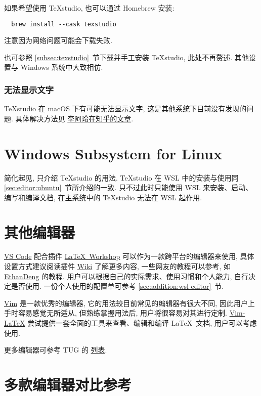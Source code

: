 如果希望使用 \TeX studio, 也可以通过 Homebrew 安装:
\begin{lstlisting}
  brew install --cask texstudio
\end{lstlisting}
注意因为网络问题可能会下载失败.

也可参照 \ref{subsec:texstudio}~节下载并手工安装 \TeX studio, 此处不再赘述.
其他设置与 Windows 系统中大致相仿.

\subsubsection{无法显示文字}

\TeX studio 在 macOS 下有可能无法显示文字,
这是其他系统下目前没有发现的问题.
具体解决方法见%
\href{https://zhuanlan.zhihu.com/p/80728204}{李阿玲在知乎的文章}.

\section{Windows Subsystem for Linux}\label{sec:editor:wsl}

简化起见,
只介绍 \TeX studio 的用法.
\TeX studio 在 WSL 中的安装与使用同 \ref{sec:editor:ubuntu}~节所介绍的一致.
只不过此时只能使用 WSL 来安装、启动、编写和编译文档,
在主系统中的 \TeX studio 无法在 WSL 起作用.

\section{其他编辑器}

\href{https://code.visualstudio.com/}{VS Code}
配合插件
\href{https://marketplace.visualstudio.com/items?itemName=James-Yu.latex-workshop}{\LaTeX\ Workshop}
可以作为一款跨平台的编辑器来使用,
具体设置方式建议阅读插件
\href{https://github.com/James-Yu/LaTeX-Workshop/wiki}{Wiki}
了解更多内容,
一些网友的教程可以参考,
如
\href{https://github.com/EthanDeng/vscode-latex}{EthanDeng}
的教程.
用户可以根据自己的实际需求、使用习惯和个人能力,
自行决定是否使用.
一份个人使用的配置单可参考 \ref{sec:addition:wsl-editor}~节.

\href{https://www.vim.org/}{Vim} 是一款优秀的编辑器,
它的用法较目前常见的编辑器有很大不同,
因此用户上手时容易感觉无所适从,
但熟练掌握用法后,
用户将很容易对其进行定制.
\href{http://vim-latex.sourceforge.net/}{Vim-LaTeX}
尝试提供一套全面的工具来查看、编辑和编译 \LaTeX\ 文档,
用户可以考虑使用.

更多编辑器可参考 TUG 的%
\href{https://tug.org/interest.html#editors}{列表}.

\section{多款编辑器对比参考}

